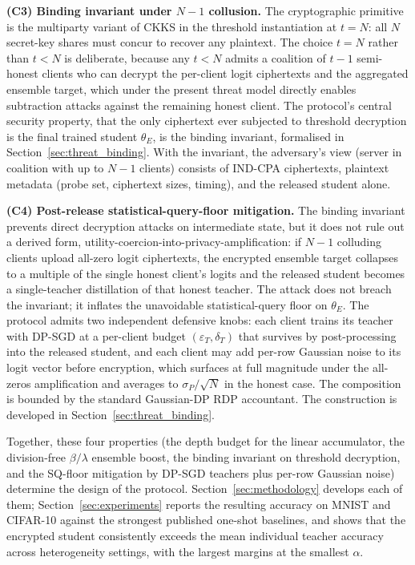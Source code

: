\par\noindent\textbf{(C3) Binding invariant under $N{-}1$ collusion.} The cryptographic primitive is the multiparty variant of CKKS in the threshold instantiation at $t{=}N$: all $N$ secret-key shares must concur to recover any plaintext. The choice $t{=}N$ rather than $t < N$ is deliberate, because any $t < N$ admits a coalition of $t{-}1$ semi-honest clients who can decrypt the per-client logit ciphertexts and the aggregated ensemble target, which under the present threat model directly enables subtraction attacks against the remaining honest client. The protocol's central security property, that the only ciphertext ever subjected to threshold decryption is the final trained student $\theta_E$, is the binding invariant, formalised in Section~\ref{sec:threat_binding}. With the invariant, the adversary's view (server in coalition with up to $N{-}1$ clients) consists of IND-CPA ciphertexts, plaintext metadata (probe set, ciphertext sizes, timing), and the released student alone.

\par\noindent\textbf{(C4) Post-release statistical-query-floor mitigation.} The binding invariant prevents direct decryption attacks on intermediate state, but it does not rule out a derived form, utility-coercion-into-privacy-amplification: if $N{-}1$ colluding clients upload all-zero logit ciphertexts, the encrypted ensemble target collapses to a multiple of the single honest client's logits and the released student becomes a single-teacher distillation of that honest teacher. The attack does not breach the invariant; it inflates the unavoidable statistical-query floor on $\theta_E$. The protocol admits two independent defensive knobs: each client trains its teacher with DP-SGD at a per-client budget $(\varepsilon_T, \delta_T)$ that survives by post-processing into the released student, and each client may add per-row Gaussian noise to its logit vector before encryption, which surfaces at full magnitude under the all-zeros amplification and averages to $\sigma_P/\sqrt N$ in the honest case. The composition is bounded by the standard Gaussian-DP RDP accountant. The construction is developed in Section~\ref{sec:threat_binding}.

Together, these four properties (the depth budget for the linear accumulator, the division-free $\beta/\lambda$ ensemble boost, the binding invariant on threshold decryption, and the SQ-floor mitigation by DP-SGD teachers plus per-row Gaussian noise) determine the design of the protocol. Section~\ref{sec:methodology} develops each of them; Section~\ref{sec:experiments} reports the resulting accuracy on MNIST and CIFAR-10 against the strongest published one-shot baselines, and shows that the encrypted student consistently exceeds the mean individual teacher accuracy across heterogeneity settings, with the largest margins at the smallest $\alpha$.



